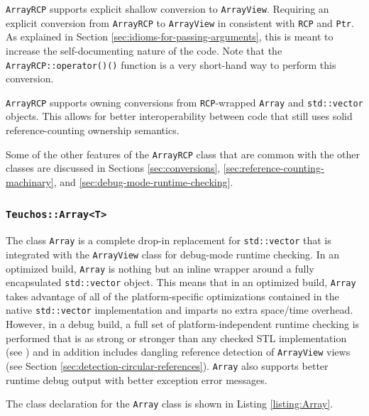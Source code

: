 \documentclass[pdf,ps2pdf,11pt]{SANDreport}
\begin{document}
{}\texttt{ArrayRCP} supports explicit shallow conversion to
{}\texttt{ArrayView}.  Requiring an explicit conversion from
{}\texttt{ArrayRCP} to {}\texttt{ArrayView} in consistent with
{}\texttt{RCP} and {}\texttt{Ptr}.  As explained in Section
{}\ref{sec:idioms-for-passing-arguments}, this is meant to increase
the self-documenting nature of the code.  Note that the
{}\texttt{ArrayRCP::operator()()} function is a very short-hand way to
perform this conversion.

{}\texttt{ArrayRCP} supports owning conversions from
{}\texttt{RCP}-wrapped {}\texttt{Array} and {}\texttt{std::vector}
objects.  This allows for better interoperability between code that
still uses solid reference-counting ownership semantics.

Some of the other features of the {}\texttt{ArrayRCP} class that are
common with the other classes are discussed in Sections
{}\ref{sec:conversions}, {}\ref{sec:reference-counting-machinary}, and
{}\ref{sec:debug-mode-runtime-checking}.


%
{}\subsubsection{\texttt{Teuchos::Array<T>}}
\label{sec:Array}
%

The class {}\texttt{Array} is a complete drop-in replacement for
{}\texttt{std::vector} that is integrated with the
{}\texttt{ArrayView} class for debug-mode runtime checking.  In an
optimized build, {}\texttt{Array} is nothing but an inline wrapper
around a fully encapsulated {}\texttt{std::vector} object.  This means
that in an optimized build, {}\texttt{Array} takes advantage of all of
the platform-specific optimizations contained in the native
{}\texttt{std::vector} implementation and imparts no extra space/time
overhead.  However, in a debug build, a full set of
platform-independent runtime checking is performed that is as strong
or stronger than any checked STL implementation (see {}\cite[Item
{}\#83]{C++CodingStandards05}) and in addition includes dangling
reference detection of {}\texttt{ArrayView} views (see Section
{}\ref{sec:detection-circular-references}).  {}\texttt{Array} also
supports better runtime debug output with better exception error
messages.

The class declaration for the {}\texttt{Array} class is shown in
Listing {}\ref{listing:Array}.
\end{document}
